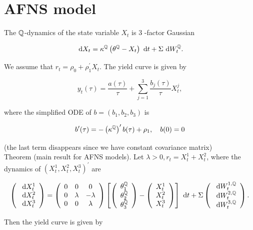 \section{AFNS model}
The $\mathbb{Q}$-dynamics of the state variable $X_{t}$ is 3 -factor Gaussian

$$
\text{ d}  X_{t}=\kappa^{\mathbb{Q}}\left(\theta^{\mathbb{Q}}-X_{t}\right) \text{ d}  t+\Sigma \text{ d}  W_{t}^{\mathbb{Q}} .
$$

We assume that $r_{t}=\rho_{0}+\rho_{1}^{\prime} X_{t}$. The yield curve is given by

$$
y_{t}(\tau)=\frac{a(\tau)}{\tau}+\sum_{j=1}^{3} \frac{b_{j}(\tau)}{\tau} X_{t}^{j},
$$

where the simplified ODE of $b=\left(b_{1}, b_{2}, b_{3}\right)$ is

$$
b^{\prime}(\tau)=-\left(\kappa^{\mathbb{Q}}\right)^{\prime} b(\tau)+\rho_{1}, \quad b(0)=0
$$

(the last term disappears since we have constant covariance matrix)\\
Theorem (main result for AFNS models). Let $\lambda>0, r_{t}=X_{t}^{1}+X_{t}^{2}$, where the dynamics of $\left(X_{t}^{1}, X_{t}^{2}, X_{t}^{3}\right)^{\prime}$ are

$$
\left(\begin{array}{l}
\text{ d}  X_{t}^{1} \\
\text{ d}  X_{t}^{2} \\
\text{ d}  X_{t}^{3}
\end{array}\right)=\left(\begin{array}{ccc}
0 & 0 & 0 \\
0 & \lambda & -\lambda \\
0 & 0 & \lambda
\end{array}\right)\left[\left(\begin{array}{c}
\theta_{1}^{\mathbb{Q}} \\
\theta_{2}^{\mathbb{Q}} \\
\theta_{3}^{\mathbb{Q}}
\end{array}\right)-\left(\begin{array}{c}
X_{t}^{1} \\
X_{t}^{2} \\
X_{t}^{3}
\end{array}\right)\right] \text{ d}  t+\Sigma\left(\begin{array}{l}
\text{ d}  W_{t}^{1, \mathbb{Q}} \\
\text{ d}  W_{t}^{2, \mathbb{Q}} \\
\text{ d}  W_{t}^{3, \mathbb{Q}}
\end{array}\right) .
$$

Then the yield curve is given by

